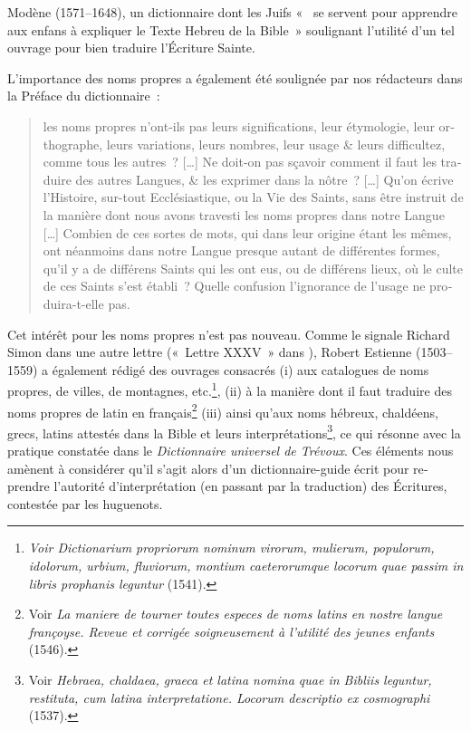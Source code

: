 \documentclass[output=paper,colorlinks,citecolor=brown,arabicfont,chinesefont,booklanguage=french]{langscibook}
\begin{document}
\begin{otherlanguage}{french}
\begin{sloppypar}
Modène (1571--1648), un dictionnaire dont les Juifs «~ se servent pour apprendre aux enfans à expliquer le Texte Hebreu de la Bible~» soulignant l’utilité d’un tel ouvrage pour bien traduire l’Écriture Sainte.
\end{sloppypar}

L’importance des noms propres a également été soulignée par nos rédacteurs dans la Préface du dictionnaire~: 
\begin{quote}
    les noms propres n’ont-ils pas leurs significations, leur étymologie, leur orthographe, leurs variations, leurs nombres, leur usage \& leurs difficultez, comme tous les autres~? […] Ne doit-on pas sçavoir comment il faut les traduire des autres Langues, \& les exprimer dans la nôtre~? […] Qu’on écrive l’Histoire, sur-tout Ecclésiastique, ou la Vie des Saints, sans être instruit de la manière dont nous avons travesti les noms propres dans notre Langue […] Combien de ces sortes de mots, qui dans leur origine étant les mêmes, ont néanmoins dans notre Langue presque autant de différentes formes, qu'il y a de différens Saints qui les ont eus, ou de différens lieux, où le culte de ces Saints s'est établi~? Quelle confusion l'ignorance de l'usage ne produira-t-elle pas.
\end{quote} 
Cet intérêt pour les noms propres n’est pas nouveau. Comme le signale Richard Simon dans une autre lettre («~Lettre XXXV~» dans \citealt[286--294]{Simon1730}), Robert Estienne (1503--1559) a également rédigé des ouvrages consacrés (i) aux catalogues de noms propres, de villes, de montagnes, etc.\footnote{\emph{Voir Dictionarium propriorum nominum virorum, mulierum, populorum, idolorum, urbium, fluviorum, montium caeterorumque locorum quae passim in libris prophanis leguntur} (1541).}, (ii) à la manière dont il faut traduire des noms propres de latin en français\footnote{Voir \emph{La maniere de tourner toutes especes de noms latins en nostre langue françoyse. Reveue et corrigée soigneusement à l’utilité des jeunes enfants} (1546).} (iii) ainsi qu’aux noms hébreux, chaldéens, grecs, latins attestés dans la Bible et leurs interprétations\footnote{Voir \emph{Hebraea, chaldaea, graeca et latina nomina quae in Bibliis leguntur, restituta, cum latina interpretatione. Locorum descriptio ex cosmographi} (1537).}, ce qui résonne avec la pratique constatée dans le \emph{Dictionnaire universel de Trévoux}. Ces éléments nous amènent à considérer qu’il s’agit alors d’un dictionnaire-guide écrit pour reprendre l’autorité d’interprétation (en passant par la traduction) des Écritures, contestée par les huguenots.  


\end{otherlanguage}
\end{document}
